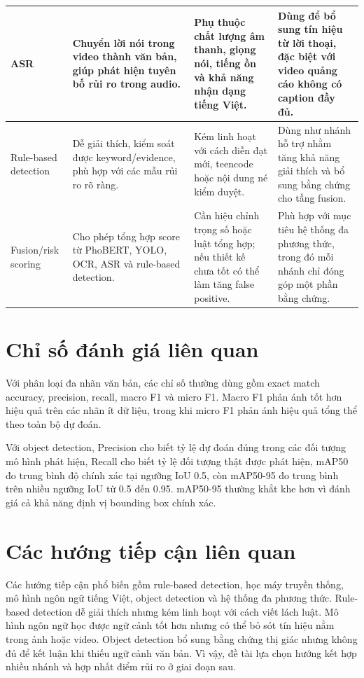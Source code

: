{\begin{longtable}{|L{0.16\textwidth}|L{0.23\textwidth}|L{0.23\textwidth}|L{0.20\textwidth}|}
ASR & Chuyển lời nói trong video thành văn bản, giúp phát hiện tuyên bố rủi ro trong audio. & Phụ thuộc chất lượng âm thanh, giọng nói, tiếng ồn và khả năng nhận dạng tiếng Việt. & Dùng để bổ sung tín hiệu từ lời thoại, đặc biệt với video quảng cáo không có caption đầy đủ. \\ \hline
Rule-based detection & Dễ giải thích, kiểm soát được keyword/evidence, phù hợp với các mẫu rủi ro rõ ràng. & Kém linh hoạt với cách diễn đạt mới, teencode hoặc nội dung né kiểm duyệt. & Dùng như nhánh hỗ trợ nhằm tăng khả năng giải thích và bổ sung bằng chứng cho tầng fusion. \\ \hline
Fusion/risk scoring & Cho phép tổng hợp score từ PhoBERT, YOLO, OCR, ASR và rule-based detection. & Cần hiệu chỉnh trọng số hoặc luật tổng hợp; nếu thiết kế chưa tốt có thể làm tăng false positive. & Phù hợp với mục tiêu hệ thống đa phương thức, trong đó mỗi nhánh chỉ đóng góp một phần bằng chứng. \\ \hline
\end{longtable}
}

\section{Chỉ số đánh giá liên quan}
Với phân loại đa nhãn văn bản, các chỉ số thường dùng gồm exact match accuracy, precision, recall, macro F1 và micro F1. Macro F1 phản ánh tốt hơn hiệu quả trên các nhãn ít dữ liệu, trong khi micro F1 phản ánh hiệu quả tổng thể theo toàn bộ dự đoán.

Với object detection, Precision cho biết tỷ lệ dự đoán đúng trong các đối tượng mô hình phát hiện, Recall cho biết tỷ lệ đối tượng thật được phát hiện, mAP50 đo trung bình độ chính xác tại ngưỡng IoU 0.5, còn mAP50-95 đo trung bình trên nhiều ngưỡng IoU từ 0.5 đến 0.95. mAP50-95 thường khắt khe hơn vì đánh giá cả khả năng định vị bounding box chính xác.

\section{Các hướng tiếp cận liên quan}
Các hướng tiếp cận phổ biến gồm rule-based detection, học máy truyền thống, mô hình ngôn ngữ tiếng Việt, object detection và hệ thống đa phương thức. Rule-based detection dễ giải thích nhưng kém linh hoạt với cách viết lách luật. Mô hình ngôn ngữ học được ngữ cảnh tốt hơn nhưng có thể bỏ sót tín hiệu nằm trong ảnh hoặc video. Object detection bổ sung bằng chứng thị giác nhưng không đủ để kết luận khi thiếu ngữ cảnh văn bản. Vì vậy, đề tài lựa chọn hướng kết hợp nhiều nhánh và hợp nhất điểm rủi ro ở giai đoạn sau.
